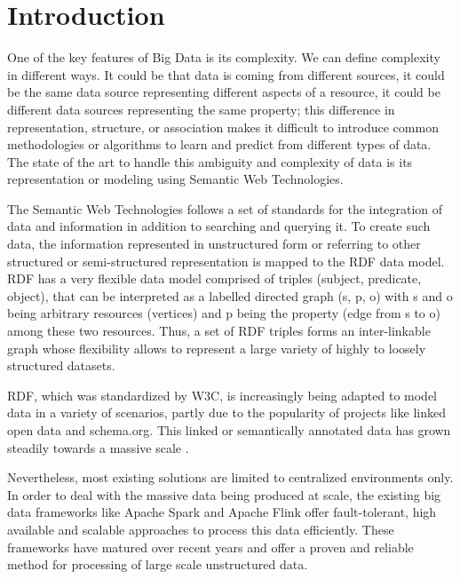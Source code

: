 \chapter{Introduction}
\label{chapter:intro}
One of the key features of Big Data is its complexity. 
We can define complexity in different ways.
It could be that data is coming from different sources, it could be the same data source representing different aspects of a resource, it could be different data sources representing the same property; this difference in representation, structure, or association makes it difficult to introduce common methodologies or algorithms to learn and predict from different types of data. 
The state of the art to handle this ambiguity and complexity of data is its representation or modeling using Semantic Web Technologies.

The Semantic Web Technologies follows a set of standards for the integration of data and information in addition to searching and querying it. 
To create such data, the information represented in unstructured form or referring to other structured or semi-structured representation is mapped to the \gls{RDF} data model. 
\gls{RDF} has a very flexible data model comprised of triples (subject, predicate, object), that can be interpreted as a labelled directed graph (s, p, o) with s and o being arbitrary resources (vertices) and p being the property (edge from s to o) among these two resources. 
Thus, a set of \gls{RDF} triples forms an inter-linkable graph whose flexibility allows to represent a large variety of highly to loosely structured datasets. 

\gls{RDF}, which was standardized by \gls{W3C}, is increasingly being adapted to model data in a variety of scenarios, partly due to the popularity of projects like linked open data and schema.org. 
This linked or semantically annotated data has grown steadily towards a massive scale .

Nevertheless, most existing solutions are limited to centralized environments only.
In order to deal with the massive data being produced at scale, the existing big data frameworks like Apache Spark and Apache Flink offer fault-tolerant, high available and scalable approaches to process this data efficiently. 
These frameworks have matured over recent years and offer a proven and reliable method for processing of large scale unstructured data.

